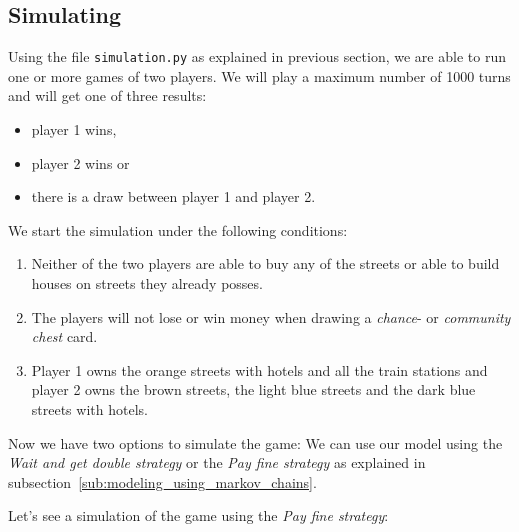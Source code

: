 \newpage

\subsection{Simulating} %
\label{sub:simulating}
Using the file \texttt{simulation.py} as explained in previous section,
we are able to run one or more games of two players. 
We will play a maximum number of 1000 turns and will get one of three results:

\begin{itemize}
	\item player 1 wins,
	\item player 2 wins or
	\item there is a draw between player 1 and player 2.
\end{itemize}

\noindent We start the simulation under the following conditions:

\begin{enumerate}
	\item Neither of the two players are able to buy any of the streets or able to build houses on 
	streets they already posses.
	\item The players will not lose or win money when drawing a \emph{chance}- or 
	\emph{community chest} card.
	\item Player 1 owns the orange streets with hotels and all the train stations
	and player 2 owns the brown streets, the light blue streets and the dark blue streets
	with hotels.
\end{enumerate}

\noindent Now we have two options to simulate the game: We can use our model using the 
\emph{Wait and get double strategy} or the \emph{Pay fine strategy} as explained 
in subsection~\ref{sub:modeling_using_markov_chains}.


\noindent Let's see a simulation of the game using the \emph{Pay fine strategy}:

\vspace{1\baselineskip}

